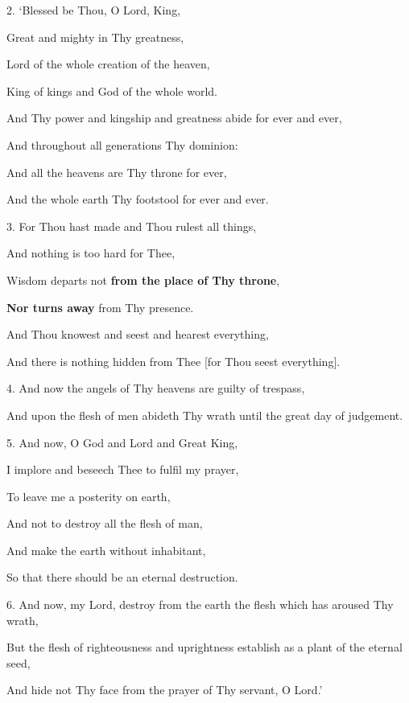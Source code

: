 2. ‘Blessed be Thou, O Lord, King,

Great and mighty in Thy greatness,

Lord of the whole creation of the heaven,

King of kings and God of the whole world.

And Thy power and kingship and greatness abide for ever and ever,

And throughout all generations Thy dominion:

And all the heavens are Thy throne for ever,

And the whole earth Thy footstool for ever and ever.

3. For Thou hast made and Thou rulest all things,

And nothing is too hard for Thee,

Wisdom departs not \textbf{from the place of Thy throne},

\textbf{Nor turns away} from Thy presence.

And Thou knowest and seest and hearest everything,

And there is nothing hidden from Thee [for Thou seest everything].

4. And now the angels of Thy heavens are guilty of trespass,

And upon the flesh of men abideth Thy wrath until the great day of judgement.

5. And now, O God and Lord and Great King,

I implore and beseech Thee to fulfil my prayer,

To leave me a posterity on earth,

And not to destroy all the flesh of man,

And make the earth without inhabitant,

So that there should be an eternal destruction.

6. And now, my Lord, destroy from the earth the flesh which has aroused Thy wrath,

But the flesh of righteousness and uprightness establish as a plant of the eternal seed,

And hide not Thy face from the prayer of Thy servant, O Lord.’


